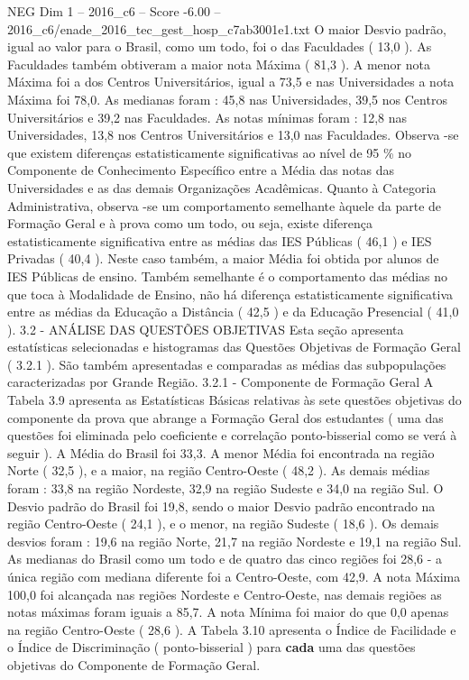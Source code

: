 \begin{textsample}{NEG Dim 1 – 2016\_c6 – Score -6.00 – 2016\_c6/enade\_2016\_tec\_gest\_hosp\_c7ab3001e1.txt}
O maior Desvio padrão, igual ao valor para o Brasil, como um todo, foi o das Faculdades ( 13,0 ).
As Faculdades também obtiveram a maior nota Máxima ( 81,3 ).
A menor nota Máxima foi a dos Centros Universitários, igual a 73,5 e nas Universidades a nota Máxima foi 78,0.
As medianas foram : 45,8 nas Universidades, 39,5 nos Centros Universitários e 39,2 nas Faculdades.
As notas mínimas foram : 12,8 nas Universidades, 13,8 nos Centros Universitários e 13,0 nas Faculdades.
Observa -se que existem diferenças estatisticamente significativas ao nível de 95 \% no Componente de Conhecimento Específico entre a Média das notas das Universidades e as das demais Organizações Acadêmicas.
Quanto à Categoria Administrativa, observa -se um comportamento semelhante àquele da parte de Formação Geral e à prova como um todo, ou seja, existe diferença estatisticamente significativa entre as médias das IES Públicas ( 46,1 ) e IES Privadas ( 40,4 ).
Neste caso também, a maior Média foi obtida por alunos de IES Públicas de ensino.
Também semelhante é o comportamento das médias no que toca à Modalidade de Ensino, não há diferença estatisticamente significativa entre as médias da Educação a Distância ( 42,5 ) e da Educação Presencial ( 41,0 ). 3.2 - ANÁLISE DAS QUESTÕES OBJETIVAS Esta seção apresenta estatísticas selecionadas e histogramas das Questões Objetivas de Formação Geral ( 3.2.1 ).
São também apresentadas e comparadas as médias das subpopulações caracterizadas por Grande Região. 3.2.1 - Componente de Formação Geral A Tabela 3.9 apresenta as Estatísticas Básicas relativas às sete questões objetivas do componente da prova que abrange a Formação Geral dos estudantes ( uma das questões foi eliminada pelo coeficiente e correlação ponto-bisserial como se verá à seguir ).
A Média do Brasil foi 33,3.
A menor Média foi encontrada na região Norte ( 32,5 ), e a maior, na região Centro-Oeste ( 48,2 ).
As demais médias foram : 33,8 na região Nordeste, 32,9 na região Sudeste e 34,0 na região Sul.
O Desvio padrão do Brasil foi 19,8, sendo o maior Desvio padrão encontrado na região Centro-Oeste ( 24,1 ), e o menor, na região Sudeste ( 18,6 ).
Os demais desvios foram : 19,6 na região Norte, 21,7 na região Nordeste e 19,1 na região Sul.
As medianas do Brasil como um todo e de quatro das cinco regiões foi 28,6 - a única região com mediana diferente foi a Centro-Oeste, com 42,9.
A nota Máxima 100,0 foi alcançada nas regiões Nordeste e Centro-Oeste, nas demais regiões as notas máximas foram iguais a 85,7.
A nota Mínima foi maior do que 0,0 apenas na região Centro-Oeste ( 28,6 ).
A Tabela 3.10 apresenta o Índice de Facilidade e o Índice de Discriminação ( ponto-bisserial ) para \textbf{cada} uma das questões objetivas do Componente de Formação Geral.

\end{textsample}
